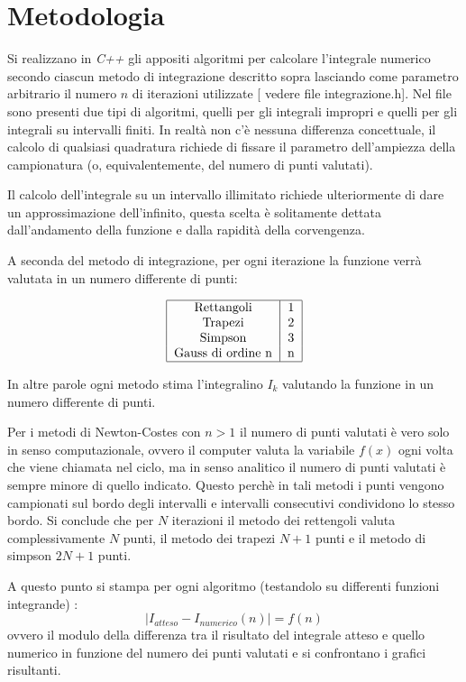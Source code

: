 \documentclass{article}
\begin{document}
\section{Metodologia}
Si realizzano in \emph{C++} gli appositi algoritmi per calcolare l'integrale numerico secondo ciascun metodo di integrazione descritto sopra lasciando come parametro arbitrario il numero $n$ di iterazioni utilizzate [ vedere file integrazione.h].
Nel file sono presenti due tipi di algoritmi, quelli per gli integrali impropri e quelli per gli integrali su intervalli finiti. In realtà non c'è nessuna differenza concettuale, il calcolo di qualsiasi quadratura richiede di fissare il parametro dell'ampiezza della campionatura (o, equivalentemente, del numero di punti valutati). 

Il calcolo dell'integrale su un intervallo illimitato richiede ulteriormente di dare un approssimazione dell'infinito, questa scelta è solitamente dettata dall'andamento della funzione e dalla rapidità della corvengenza.

A seconda del metodo di integrazione, per ogni iterazione la funzione verrà valutata in un numero differente di punti:

\begin{displaymath}		
		\begin{tabular}{|c|c|}
		\hline
		\textrm{Rettangoli} & 1 \\
		\textrm{Trapezi} & 2 \\
		\textrm{Simpson} & 3 \\
		\textrm{Gauss di ordine n} & n \\
		\hline
		\end{tabular} 
\end{displaymath}

In altre parole ogni metodo stima l'integralino $I_{k}$ valutando la funzione in un numero differente di punti.

Per i metodi di Newton-Costes con $n>1$ il numero di punti valutati è vero solo in senso computazionale, ovvero il computer valuta la variabile $f(x)$ ogni volta che viene chiamata nel ciclo, ma in senso analitico il numero di punti valutati è sempre minore di quello indicato. Questo perchè in tali metodi i punti vengono campionati sul bordo degli intervalli e intervalli consecutivi condividono lo stesso bordo. Si conclude che per $N$ iterazioni il metodo dei rettengoli valuta complessivamente $N$ punti, il metodo dei trapezi $N+1$ punti e il metodo di simpson $2N+1$ punti. 

A questo punto si stampa per ogni algoritmo (testandolo su differenti funzioni integrande) :
$$\mid I_{atteso}-I_{numerico}(n)\mid = f(n)$$
ovvero il  modulo della differenza tra il risultato del integrale atteso e quello numerico in funzione del numero dei punti valutati e si confrontano i grafici risultanti.
\end{document}
